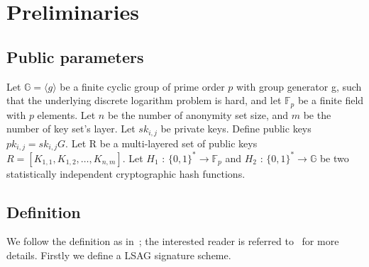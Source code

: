 \section{Preliminaries}
\subsection{Public parameters}
    Let $\mathbb G= \langle g \rangle$ be a finite cyclic group of prime order $p$ with group generator g, such that the underlying discrete logarithm problem is hard, and let ${\mathbb F}_{p}$ be a finite field with $p$ elements. Let $n$ be the number of anonymity set size, and $m$ be the number of key set's layer. Let $sk_{i,j}$ be private keys. Define public keys $pk_{i,j}=sk_{i,j}G$. Let R be a multi-layered set of public keys $R = [K_{1,1},K_{1,2},\ldots,K_{n,m}]$. Let $H_1$ : $ \{0,1 \} ^* \rightarrow {\mathbb F}_{p}$ and $H_2$ : $ \{0,1 \} ^* \rightarrow \mathbb G$ be two statistically independent cryptographic hash functions.
    
\subsection{Definition}
    We follow the definition as in~\cite{clsag}; the interested reader is referred to~\cite{Linkable-ring-signature} for more details. Firstly we define a LSAG signature scheme.
    
